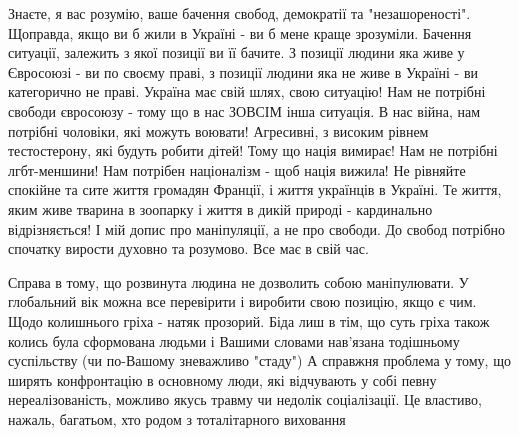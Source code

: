 \begin{itemize}
\begin{itemize}
Знаєте, я вас розумію, ваше бачення свобод, демократії та "незашореності".
Щоправда, якщо ви б жили в Україні - ви б мене краще зрозуміли. Бачення
ситуації, залежить з якої позиції ви її бачите. З позиції людини яка живе у
Євросоюзі - ви по своєму праві, з позиції людини яка не живе в Україні - ви
категорично не праві. Україна має свій шлях, свою ситуацію! Нам не потрібні
свободи євросоюзу - тому що в нас ЗОВСІМ інша ситуація. В нас війна, нам
потрібні чоловіки, які можуть воювати! Агресивні, з високим рівнем
тестостерону, які будуть робити дітей! Тому що нація вимирає! Нам не потрібні
лгбт-меншини! Нам потрібен націоналізм - щоб нація вижила! Не рівняйте спокійне
та сите життя громадян Франції, і життя українців в Україні. Те життя, яким
живе тварина в зоопарку і життя в дикій природі - кардинально відрізняється! І
мій допис про маніпуляції, а не про свободи. До свобод потрібно спочатку
вирости духовно та розумово. Все має в свій час.

\end{itemize}

 

Справа в тому, що розвинута людина не дозволить собою маніпулювати. У
глобальний вік можна все перевірити і виробити свою позицію, якщо є чим. Щодо
колишнього гріха - натяк прозорий. Біда лиш в тім, що суть гріха також колись
була сформована людьми і Вашими словами нав'язана тодішньому суспільству (чи
по-Вашому зневажливо "стаду") А справжня проблема у тому, що ширять
конфронтацію в основному люди, які відчувають у собі певну нереалізованість,
можливо якусь травму чи недолік соціалізації. Це властиво, нажаль, багатьом,
хто родом з тоталітарного виховання
\end{itemize}


